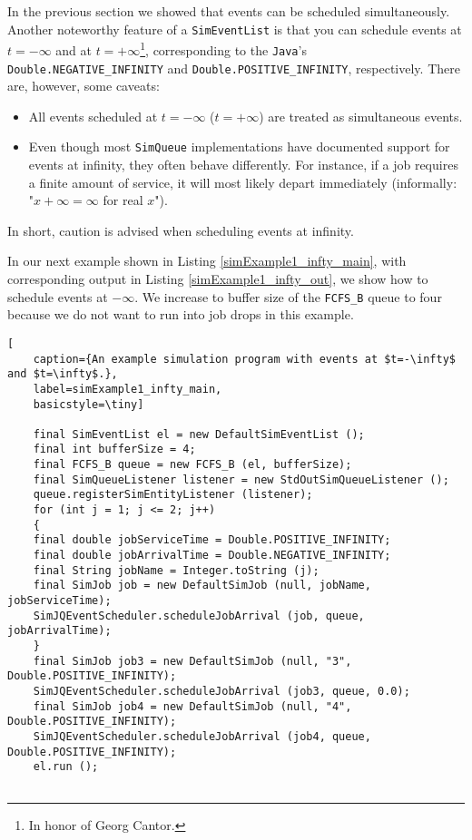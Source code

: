 In the previous section we showed that
events can be scheduled simultaneously.
Another noteworthy feature of a \lstinline|SimEventList|
is that you can schedule events
at $t=-\infty$ and at $t=+\infty$\footnote{
	In honor of Georg Cantor.},
corresponding to the \lstinline|Java|'s
\lstinline|Double.NEGATIVE_INFINITY| and
\lstinline|Double.POSITIVE_INFINITY|,
respectively.
There are, however, some caveats:
\begin{itemize}
	\item All events scheduled at $t=-\infty$ ($t=+\infty$)
	are treated as simultaneous events.
	\item Even though most \lstinline|SimQueue|
	implementations have documented support
	for events at infinity,
	they often behave differently.
	For instance, if a job requires
	a finite amount of service,
	it will most likely depart immediately
	(informally: "$x + \infty = \infty$ for real $x$").
\end{itemize}
In short, caution is advised when scheduling events at infinity.

In our next example shown in Listing \ref{simExample1_infty_main},
with corresponding output in Listing \ref{simExample1_infty_out},
we show how to schedule events at $-\infty$.
We increase to buffer size of the \lstinline|FCFS_B| queue to four
because we do not want to run into job drops in this example.

\begin{lstfloat}
	\begin{lstlisting}[
	caption={An example simulation program with events at $t=-\infty$ and $t=\infty$.},
	label=simExample1_infty_main,
	basicstyle=\tiny]
	
	final SimEventList el = new DefaultSimEventList ();
	final int bufferSize = 4;
	final FCFS_B queue = new FCFS_B (el, bufferSize);
	final SimQueueListener listener = new StdOutSimQueueListener ();
	queue.registerSimEntityListener (listener);
	for (int j = 1; j <= 2; j++)
	{
	final double jobServiceTime = Double.POSITIVE_INFINITY;
	final double jobArrivalTime = Double.NEGATIVE_INFINITY;
	final String jobName = Integer.toString (j);
	final SimJob job = new DefaultSimJob (null, jobName, jobServiceTime);
	SimJQEventScheduler.scheduleJobArrival (job, queue, jobArrivalTime);
	}
	final SimJob job3 = new DefaultSimJob (null, "3", Double.POSITIVE_INFINITY);
	SimJQEventScheduler.scheduleJobArrival (job3, queue, 0.0);
	final SimJob job4 = new DefaultSimJob (null, "4", Double.POSITIVE_INFINITY);
	SimJQEventScheduler.scheduleJobArrival (job4, queue, Double.POSITIVE_INFINITY);
	el.run ();
	
	\end{lstlisting}
\end{lstfloat}

